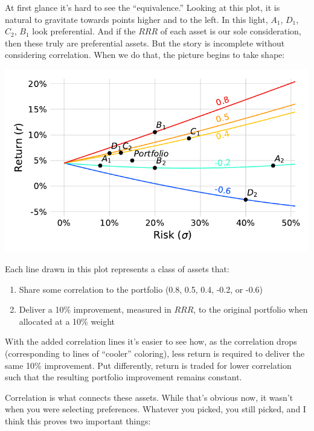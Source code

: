 \documentclass[]{article}
\providecommand{\tightlist}{%
  \setlength{\itemsep}{0pt}\setlength{\parskip}{0pt}}
\begin{document}
At first glance it's hard to see the ``equivalence.'' Looking at this
plot, it is natural to gravitate towards points higher and to the left.
In this light, \(A_1\), \(D_1\), \(C_2\), \(B_1\) look preferential. And
if the \(RRR\) of each asset is our sole consideration, then these truly
are preferential assets. But the story is incomplete without considering
correlation. When we do that, the picture begins to take shape:

\begin{center}\includegraphics{paper_files/figure-latex/Scatter with correlation lines-1} \end{center}

Each line drawn in this plot represents a class of assets that:

\begin{enumerate}
\def\labelenumi{\arabic{enumi}.}
\tightlist
\item
  Share some correlation to the portfolio (0.8, 0.5, 0.4, -0.2, or -0.6)
\item
  Deliver a 10\% improvement, measured in \(RRR\), to the original
  portfolio when allocated at a 10\% weight
\end{enumerate}

With the added correlation lines it's easier to see how, as the
correlation drops (corresponding to lines of ``cooler'' coloring), less
return is required to deliver the same 10\% improvement. Put
differently, return is traded for lower correlation such that the
resulting portfolio improvement remains constant.

Correlation is what connects these assets. While that's obvious now, it
wasn't when you were selecting preferences. Whatever you picked, you
still picked, and I think this proves two important things:
\end{document}
